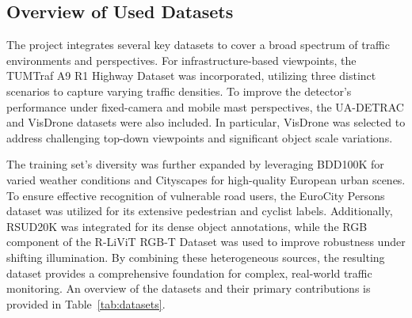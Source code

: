 \documentclass[12pt,a4paper]{report}
\begin{document}
\subsection{\textbf{Overview of Used Datasets} }
The project integrates several key datasets to cover a broad spectrum of traffic environments and perspectives. For infrastructure-based viewpoints, the TUMTraf A9 R1 Highway Dataset was incorporated, utilizing three distinct scenarios to capture varying traffic densities. To improve the detector’s performance under fixed-camera and mobile mast perspectives, the UA-DETRAC and VisDrone datasets were also included. In particular, VisDrone was selected to address challenging top-down viewpoints and significant object scale variations. 

The training set's diversity was further expanded by leveraging BDD100K for varied weather conditions and Cityscapes for high-quality European urban scenes. To ensure effective recognition of vulnerable road users, the EuroCity Persons dataset was utilized for its extensive pedestrian and cyclist labels. Additionally, RSUD20K was integrated for its dense object annotations, while the RGB component of the R-LiViT RGB-T Dataset was used to improve robustness under shifting illumination. By combining these heterogeneous sources, the resulting dataset provides a comprehensive foundation for complex, real-world traffic monitoring.
An overview of the datasets and their primary contributions is provided in Table~\ref{tab:datasets}.
\end{document}
